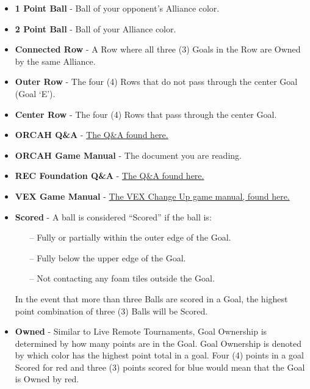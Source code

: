 \documentclass[letterpaper, 12pt]{article}
\begin{document}
\begin{itemize}[label={}]

\item\textbf{1 Point Ball} - Ball of your opponent’s Alliance color.

\item\textbf{2 Point Ball} - Ball of your Alliance color.

\item\textbf{Connected Row} - A Row where all three (3) Goals in the Row are Owned by the same Alliance.

\item\textbf{Outer Row} - The four (4) Rows that do not pass through the center Goal (Goal ‘E’).

\item\textbf{Center Row} - The four (4) Rows that pass through the center Goal.

\item\textbf{ORCAH Q\&A} - \href{https://sites.google.com/view/orcah-robotics/qa?authuser=0}{The Q\&A found here.}

\item\textbf{ORCAH Game Manual} - The document you are reading.

\item\textbf{REC Foundation Q\&A} - \href{https://www.robotevents.com/VRC/2020-2021/QA}{The Q\&A found here.}

\item\textbf{VEX Game Manual} - \href{https://content.vexrobotics.com/docs/vrc-change-up/Game-Manual-12012020.pdf}{The VEX Change Up game manual, found here.}

\item\textbf{Scored} - A ball is considered “Scored” if the ball is:

\begin{itemize}
\item[--] Fully or partially within the outer edge of the Goal.
\item[--] Fully below the upper edge of the Goal.
\item[--] Not contacting any foam tiles outside the Goal.
\end{itemize}

In the event that more than three Balls are scored in a Goal, the highest point combination of three (3) Balls will be Scored.

\item\textbf{Owned} - Similar to Live Remote Tournaments, Goal Ownership is determined by how many points are in the Goal. Goal Ownership is denoted by which color has the highest point total in a goal. Four (4) points in a goal Scored for red and three (3) points scored for blue would mean that the Goal is Owned by red.


\end{itemize}
\end{document}
